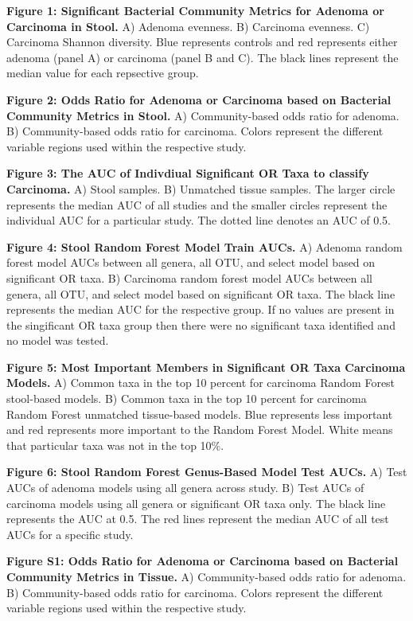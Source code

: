 \documentclass[12pt,]{article}
\begin{document}
\normalsize
\newpage

\textbf{Figure 1: Significant Bacterial Community Metrics for Adenoma or
Carcinoma in Stool.} A) Adenoma evenness. B) Carcinoma evenness. C)
Carcinoma Shannon diversity. Blue represents controls and red represents
either adenoma (panel A) or carcinoma (panel B and C). The black lines
represent the median value for each repsective group.

\textbf{Figure 2: Odds Ratio for Adenoma or Carcinoma based on Bacterial
Community Metrics in Stool.} A) Community-based odds ratio for adenoma.
B) Community-based odds ratio for carcinoma. Colors represent the
different variable regions used within the respective study.

\textbf{Figure 3: The AUC of Indivdiual Significant OR Taxa to classify
Carcinoma.} A) Stool samples. B) Unmatched tissue samples. The larger
circle represents the median AUC of all studies and the smaller circles
represent the individual AUC for a particular study. The dotted line
denotes an AUC of 0.5.

\textbf{Figure 4: Stool Random Forest Model Train AUCs.} A) Adenoma
random forest model AUCs between all genera, all OTU, and select model
based on significant OR taxa. B) Carcinoma random forest model AUCs
between all genera, all OTU, and select model based on significant OR
taxa. The black line represents the median AUC for the respective group.
If no values are present in the singificant OR taxa group then there
were no significant taxa identified and no model was tested.

\textbf{Figure 5: Most Important Members in Significant OR Taxa
Carcinoma Models.} A) Common taxa in the top 10 percent for carcinoma
Random Forest stool-based models. B) Common taxa in the top 10 percent
for carcinoma Random Forest unmatched tissue-based models. Blue
represents less important and red represents more important to the
Random Forest Model. White means that particular taxa was not in the top
10\%.

\textbf{Figure 6: Stool Random Forest Genus-Based Model Test AUCs.} A)
Test AUCs of adenoma models using all genera across study. B) Test AUCs
of carcinoma models using all genera or significant OR taxa only. The
black line represents the AUC at 0.5. The red lines represent the median
AUC of all test AUCs for a specific study.

\newpage

\textbf{Figure S1: Odds Ratio for Adenoma or Carcinoma based on
Bacterial Community Metrics in Tissue.} A) Community-based odds ratio
for adenoma. B) Community-based odds ratio for carcinoma. Colors
represent the different variable regions used within the respective
study.
\end{document}
